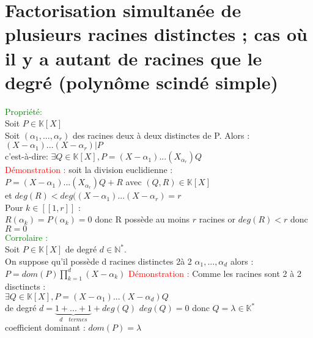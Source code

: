 \documentclass{article}
\begin{document}
\section{Factorisation simultanée de plusieurs racines distinctes ; cas où il y a autant de racines que le degré (polynôme scindé simple)}
\textcolor{green}{Propriété:} \\
Soit $P \in \mathbb K [X]$ \\
Soit $(\alpha_1,...,\alpha_r)$ des racines deux à deux distinctes de P. Alors : \\
$(X-\alpha_1)...(X-\alpha_r)|P$ \\
c'est-à-dire: $\exists Q \in \mathbb K  [X], P=(X-\alpha_1)...(X_\alpha_r)Q$\\
\textcolor{red}{Démonstration :} soit la division euclidienne : \\
$P=(X-\alpha_1)...(X_\alpha_r)Q +R$  avec $(Q,R) \in \mathbb K [X]$ \\
et $deg(R)<deg((X-\alpha_1) ...(X- \alpha_r)=r$ \\
Pour $k \in [[1,r]]$ : \\
$R(\alpha_k)=P(\alpha_k)=0$ donc R possède au moins $r$ racines or $deg(R)<r$ donc $R=0$\\
\textcolor{green}{Corrolaire :} \\
Soit $P \in \mathbb K [X]$ de degré $d \in \mathbb N^*$. \\
On suppose qu'il possède d racines distinctes 2à 2 $\alpha_1,...,\alpha_d$ alors : \\
$P=dom(P) \prod_{k=1}^d (X-\alpha_k)$
\textcolor{red}{Démonstration : } Comme les racines sont 2 à 2 disctincts : \\
$\exists Q \in \mathbb K [X], P=(X- \alpha_1)...(X- \alpha_d)Q$ \\
de degré $d=\underbrace{1+ ...+1}_{d \quad termes} + deg(Q)$ $deg(Q)=0$ donc $Q=\lambda \in \mathbb K^*$ \\
coefficient dominant : $dom(P)=\lambda$
\end{document}
